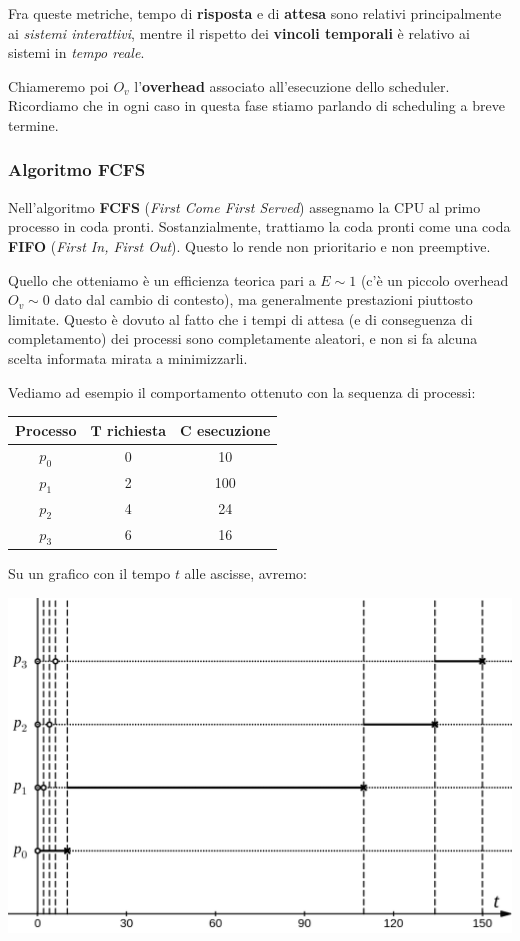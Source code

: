 \documentclass[a4paper,11pt]{article}
\begin{document}
Fra queste metriche, tempo di \textbf{risposta} e di \textbf{attesa} sono relativi principalmente ai \textit{sistemi interattivi}, mentre il rispetto dei \textbf{vincoli temporali} è relativo ai sistemi in \textit{tempo reale}.

Chiameremo poi $O_v$ l'\textbf{overhead} associato all'esecuzione dello scheduler. Ricordiamo che in ogni caso in questa fase stiamo parlando di scheduling a breve termine.

\subsubsection{Algoritmo FCFS}
Nell'algoritmo \textbf{FCFS} (\textit{First Come First Served}) assegnamo la CPU al primo processo in coda pronti. Sostanzialmente, trattiamo la coda pronti come una coda \textbf{FIFO} (\textit{First In, First Out}).
Questo lo rende non prioritario e non preemptive.

Quello che otteniamo è un efficienza teorica pari a $E\sim1$ (c'è un piccolo overhead $O_v \sim 0$ dato dal cambio di contesto), ma generalmente prestazioni piuttosto limitate.
Questo è dovuto al fatto che i tempi di attesa (e di conseguenza di completamento) dei processi sono completamente aleatori, e non si fa alcuna scelta informata mirata a minimizzarli.

\newpage

Vediamo ad esempio il comportamento ottenuto con la sequenza di processi:
\begin{table}[H]
	\center {}
	\begin{tabular} { c || c | c }
		\bfseries Processo & \bfseries $\mathbf{T}$ richiesta & \bfseries $\mathbf{C}$ esecuzione \\
		\hline
		$p_0$ & 0 & 10 \\ 
		$p_1$ & 2 & 100 \\ 
		$p_2$ & 4 & 24 \\ 
		$p_3$ & 6 & 16 
	\end{tabular}
\end{table}

Su un grafico con il tempo $t$ alle ascisse, avremo:
\begin{center}
	\includegraphics[scale=0.3]{../figures/fcfs_bad.png}
\end{center}
\end{document}
